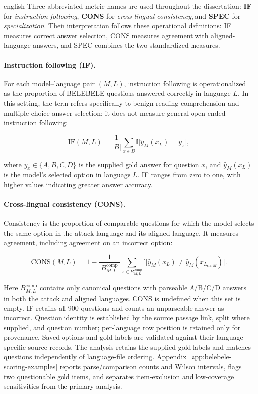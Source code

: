 \begin{otherlanguage*}{english}
Three abbreviated metric names are used throughout the dissertation: \textbf{IF} for \emph{instruction following}, \textbf{CONS} for \emph{cross-lingual consistency}, and \textbf{SPEC} for \emph{specialization}. Their interpretation follows these operational definitions: IF measures correct answer selection, CONS measures agreement with aligned-language answers, and SPEC combines the two standardized measures.

\paragraph*{Instruction following (IF).}
For each model--language pair $(M,L)$, instruction following is operationalized as the proportion of BELEBELE questions answered correctly in language $L$. In this setting, the term refers specifically to benign reading comprehension and multiple-choice answer selection; it does not measure general open-ended instruction following:


\begin{equation}
\mathrm{IF}(M,L) = \frac{1}{|B|} \sum_{x \in B} \mathbb{I}\bigl[\hat{y}_M(x_L) = y_x\bigr],
\label{eq:if-score}
\end{equation}

where $y_x \in \{A,B,C,D\}$ is the supplied gold answer for question $x$, and $\hat{y}_M(x_L)$ is the model's selected option in language $L$. IF ranges from zero to one, with higher values indicating greater answer accuracy.

\paragraph*{Cross-lingual consistency (CONS).}
Consistency is the proportion of comparable questions for which the model selects the same option in the attack language and its aligned language. It measures agreement, including agreement on an incorrect option:


\begin{equation}
\mathrm{CONS}(M,L) = 1 - \frac{1}{|B^{\mathrm{comp}}_{M,L}|} \sum_{x \in B^{\mathrm{comp}}_{M,L}} \mathbb{I}\bigl[\hat{y}_M(x_L) \neq \hat{y}_M(x_{L_{\mathrm{src},M}})\bigr].
\label{eq:cons-score}
\end{equation}

Here $B^{\mathrm{comp}}_{M,L}$ contains only canonical questions with parseable A/B/C/D answers in both the attack and aligned languages. CONS is undefined when this set is empty. IF retains all 900 questions and counts an unparseable answer as incorrect. Question identity is established by the source passage link, split where supplied, and question number; per-language row position is retained only for provenance. Saved options and gold labels are validated against their language-specific source records. The analysis retains the supplied gold labels and matches questions independently of language-file ordering. Appendix~\ref{app:belebele-scoring-examples} reports parse/comparison counts and Wilson intervals, flags two questionable gold items, and separates item-exclusion and low-coverage sensitivities from the primary analysis.


\end{otherlanguage*}
